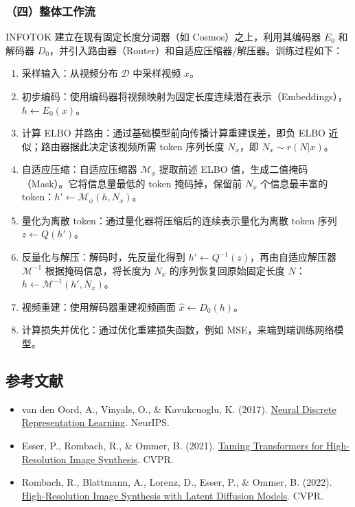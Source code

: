 \hypertarget{ux56dbux6574ux4f53ux5de5ux4f5cux6d41}{%
\subsubsection{（四）整体工作流}\label{ux56dbux6574ux4f53ux5de5ux4f5cux6d41}}

INFOTOK 建立在现有固定长度分词器（如 Cosmos）之上，利用其编码器 \(E_0\) 和解码器 \(D_0\)，并引入路由器（Router）和自适应压缩器/解压器。训练过程如下：

\begin{enumerate}
\def\labelenumi{\arabic{enumi}.}
\tightlist
\item
  采样输入：从视频分布 \(\mathcal{D}\) 中采样视频 \(x\)。
\item
  初步编码：使用编码器将视频映射为固定长度连续潜在表示（Embeddings），\(h\leftarrow E_0(x)\)。
\item
  计算 ELBO 并路由：通过基础模型前向传播计算重建误差，即负 ELBO 近似；路由器据此决定该视频所需 token 序列长度 \(N_x\)，即 \(N_x\sim r(N|x)\)。
\item
  自适应压缩：自适应压缩器 \(\mathcal{M}_\phi\) 提取前述 ELBO 值，生成二值掩码（Mask）。它将信息量最低的 token 掩码掉，保留前 \(N_x\) 个信息最丰富的 token：\(h'\leftarrow\mathcal{M}_\phi(h,N_x)\)。
\item
  量化为离散 token：通过量化器将压缩后的连续表示量化为离散 token 序列 \(z\leftarrow Q(h')\)。
\item
  反量化与解压：解码时，先反量化得到 \(h'\leftarrow Q^{-1}(z)\)，再由自适应解压器 \(\mathcal{M}^{-1}\) 根据掩码信息，将长度为 \(N_x\) 的序列恢复回原始固定长度 \(N\)：\(h\leftarrow \mathcal{M}^{-1}(h',N_x)\)。
\item
  视频重建：使用解码器重建视频画面 \(\hat{x}\leftarrow D_0(h)\)。
\item
  计算损失并优化：通过优化重建损失函数，例如 MSE，来端到端训练网络模型。
\end{enumerate}

\hypertarget{ux53c2ux8003ux6587ux732e-182}{%
\subsection{参考文献}\label{ux53c2ux8003ux6587ux732e-182}}

\begin{itemize}
\tightlist
\item
  van den Oord, A., Vinyals, O., \& Kavukcuoglu, K. (2017). \href{https://arxiv.org/abs/1711.00937}{Neural Discrete Representation Learning}. NeurIPS.
\item
  Esser, P., Rombach, R., \& Ommer, B. (2021). \href{https://arxiv.org/abs/2012.09841}{Taming Transformers for High-Resolution Image Synthesis}. CVPR.
\item
  Rombach, R., Blattmann, A., Lorenz, D., Esser, P., \& Ommer, B. (2022). \href{https://arxiv.org/abs/2112.10752}{High-Resolution Image Synthesis with Latent Diffusion Models}. CVPR.
\end{itemize}

\clearpage
